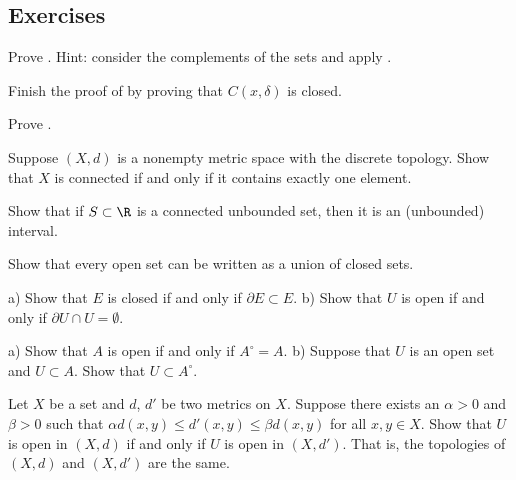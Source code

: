 \documentclass[12pt]{book}
\begin{document}
\subsection*{Exercises}

\begin{exercise}
Prove .
Hint: consider the complements of the
sets and apply .
\end{exercise}

\begin{exercise}
Finish the proof of  by
proving that $C(x,\delta)$ is closed.
\end{exercise}

\begin{exercise}
Prove .
\end{exercise}

\begin{exercise}
Suppose $(X,d)$ is a nonempty metric space with the discrete topology.
Show
that $X$ is connected if and only if it contains exactly one element.
\end{exercise}

\begin{exercise}
Show that if $S \subset \R$ is a connected unbounded set, then it is an
(unbounded) interval.
\end{exercise}

\begin{exercise}
Show that every open set can be written as a union of closed sets.
\end{exercise}

\begin{exercise}
a) Show that $E$ is closed if and only if $\partial E \subset E$.
b) Show that $U$ is open if and only if $\partial U \cap U = \emptyset$.
\end{exercise}

\begin{exercise}
a) Show that $A$ is open if and only if $A^\circ = A$.
b) Suppose that $U$ is an open set and $U \subset A$.
Show
that $U \subset A^\circ$.
\end{exercise}

\begin{exercise}
Let $X$ be a set and $d$, $d'$ be two metrics on $X$.
Suppose there exists an $\alpha > 0$ and $\beta > 0$
such that $\alpha d(x,y) \leq d'(x,y) \leq \beta d(x,y)$ for all $x,y \in X$.
Show that $U$ is open in $(X,d)$ if and only if $U$ is open in $(X,d')$.
That is, the topologies of $(X,d)$ and $(X,d')$ are the same.
\end{exercise}
\end{document}
